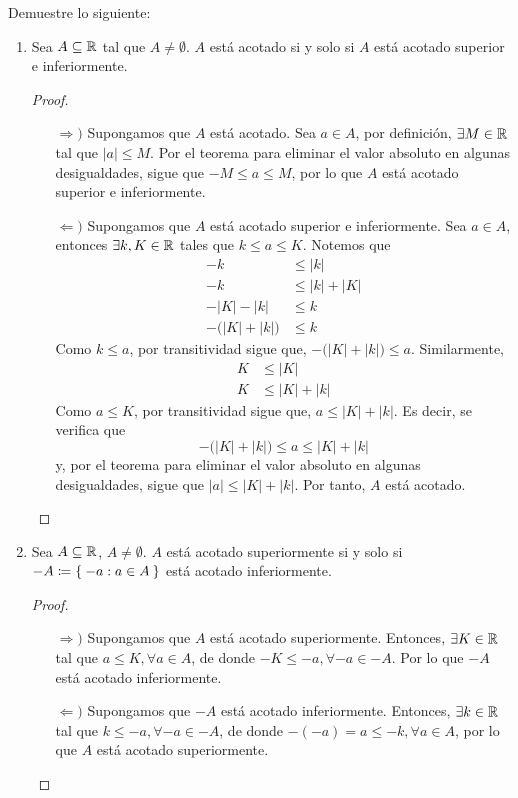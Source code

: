 Demuestre lo siguiente:

\begin{enumerate}[label=\alph*)]
  \item Sea $A\subseteq \mathbb{R}$ tal que $A\neq \emptyset$. $A$ está acotado si y solo si $A$ está acotado superior e inferiormente.
 
  \begin{proof} \leavevmode
   \begin{itemize}
    \item[$\Rightarrow)$] Supongamos que $A$ está acotado. Sea $a\in A$, por definición, $\exists M\in \mathbb{R}$ tal que $|a|\leq M$. Por el teorema para eliminar el valor absoluto en algunas desigualdades, sigue que $-M\leq a \leq M$, por lo que $A$ está acotado superior e inferiormente.
    \item[$\Leftarrow)$] Supongamos que $A$ está acotado superior e inferiormente. Sea $a\in A$, entonces $\exists k, K\in \mathbb{R}$ tales que $k\leq a \leq K$. Notemos que
    \begin{align*}
     -k &\leq |k|\\
     -k &\leq |k| + |K|\\
     -|K|-|k| &\leq k\\
     - \big(|K|+|k|\big) &\leq k
    \end{align*}
    Como $k\leq a$, por transitividad sigue que, $-\big(|K|+|k|\big) \leq a$. Similarmente,
    \begin{align*}
     K &\leq |K|\\
     K &\leq |K| + |k|
    \end{align*}
    Como $a\leq K$, por transitividad sigue que, $a\leq |K|+|k|$. Es decir, se verifica que \[-\big(|K|+|k|\big) \leq a \leq |K|+|k|\]
    y, por el teorema para eliminar el valor absoluto en algunas desigualdades, sigue que $|a| \leq |K| + |k|$. Por tanto, $A$ está acotado. \qedhere
   \end{itemize}
  \end{proof}
  
  \item Sea $A\subseteq\mathbb{R}$, $A\neq \emptyset$. $A$ está acotado superiormente si y solo si $-A\coloneqq \Set{-a: a\in A}$ está acotado inferiormente.
  
  \begin{proof}\leavevmode
  \begin{itemize}
  \item[$\Rightarrow)$] Supongamos que $A$ está acotado superiormente. Entonces, $\exists K\in \mathbb{R}$ tal que $a\leq K, \forall a\in A$, de donde $-K\leq -a, \forall -a\in -A$. Por lo que $-A$ está acotado inferiormente.
  \item[$\Leftarrow)$] Supongamos que $-A$ está acotado inferiormente. Entonces, $\exists k\in \mathbb{R}$ tal que $k\leq -a, \forall -a\in -A$, de donde $-(-a)=a\leq -k, \forall a\in A$, por lo que $A$ está acotado superiormente. \qedhere
  \end{itemize}
  \end{proof}
  

\end{enumerate}
